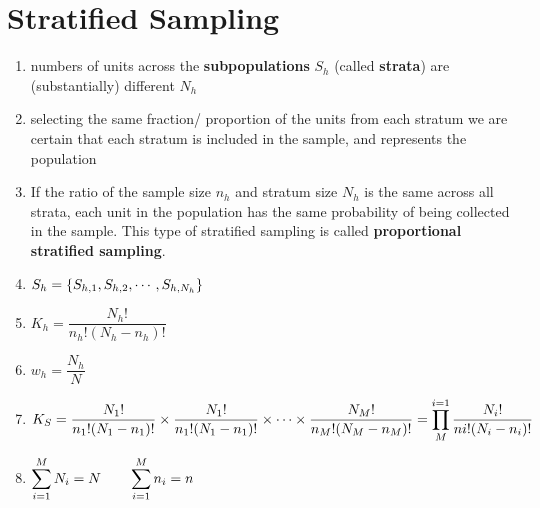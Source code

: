 \section{Stratified Sampling \cite{ism-1}}\label{Stratified Sampling}

\begin{enumerate}
    \item numbers of units across the \textbf{subpopulations} $S_h$ (called \textbf{strata}) are (substantially) different $N_h$

    \item selecting the same fraction/ proportion of the units from each stratum we are certain that each stratum is included in the sample, and represents the population

    \item If the ratio of the sample size $n_h$ and stratum size $N_h$ is the same across all strata, each unit in the population has the same probability of being collected in the sample. This type of stratified sampling is called \textbf{proportional stratified sampling}.

    \item[] $S_h = \left\{ S_{h,1}, S_{h,2},\cdots, S_{h,N_h} \right\}$

    \item[] $K_h = \dfrac{N_h!}{n_h!(N_h-n_h)!}$

    \item[] $w_h = \dfrac{N_h}{N}$

    \item[] $
        K_S = 
        \dfrac{N_1!}{n_1!(N_1-n_1)!} 
        \times
        \dfrac{N_1!}{n_1!(N_1-n_1)!} 
        \times
        \cdots
        \times
        \dfrac{N_M!}{n_M!(N_M-n_M)!}
        =
        \displaystyle\prod_{M}^{i=1} \dfrac{N_i!}{ni!(N_i-n_i)!}
    $

    \item[] $
        \displaystyle\sum_{i=1}^{M} N_i = N
        \quad\quad
        \displaystyle\sum_{i=1}^{M} n_i = n
    $


\end{enumerate}

